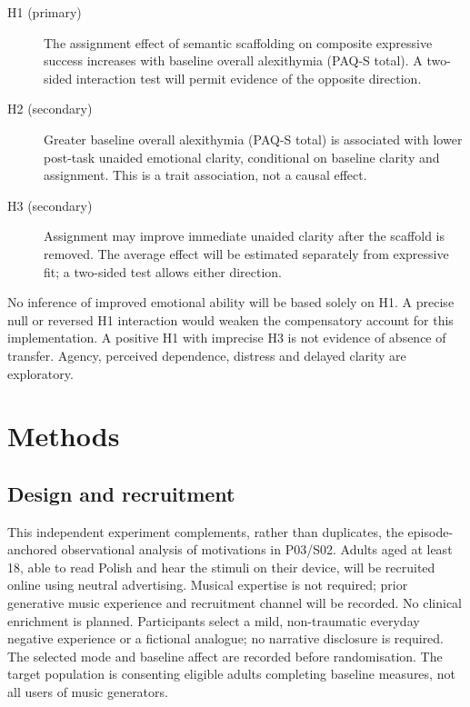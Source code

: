 \documentclass[11pt,a4paper]{article}
\begin{document}
\begin{description}
\item[H1 (primary)] The assignment effect of semantic scaffolding on composite expressive success increases with baseline overall alexithymia (PAQ-S total). A two-sided interaction test will permit evidence of the opposite direction.
\item[H2 (secondary)] Greater baseline overall alexithymia (PAQ-S total) is associated with lower post-task unaided emotional clarity, conditional on baseline clarity and assignment. This is a trait association, not a causal effect.
\item[H3 (secondary)] Assignment may improve immediate unaided clarity after the scaffold is removed. The average effect will be estimated separately from expressive fit; a two-sided test allows either direction.
\end{description}
No inference of improved emotional ability will be based solely on H1. A precise null or reversed H1 interaction would weaken the compensatory account for this implementation. A positive H1 with imprecise H3 is not evidence of absence of transfer. Agency, perceived dependence, distress and delayed clarity are exploratory.

\section{Methods}
\subsection{Design and recruitment}
This independent experiment complements, rather than duplicates, the episode-anchored observational analysis of motivations in P03/S02. Adults aged at least 18, able to read Polish and hear the stimuli on their device, will be recruited online using neutral advertising. Musical expertise is not required; prior generative music experience and recruitment channel will be recorded. No clinical enrichment is planned. Participants select a mild, non-traumatic everyday negative experience or a fictional analogue; no narrative disclosure is required. The selected mode and baseline affect are recorded before randomisation. The target population is consenting eligible adults completing baseline measures, not all users of music generators.
\end{document}
